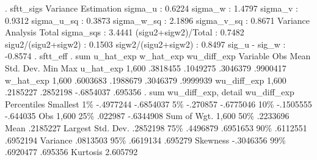 . sftt_sigs
{\smallskip}
               Variance Estimation          
sigma_u    :       0.6224
sigma_w    :       1.4797
sigma_v    :       0.9312
sigma_u_sq :       0.3873
sigma_w_sq :       2.1896
sigma_v_sq :       0.8671
               Variance Analysis          
Total sigma_sqs     :  3.4441
(sigu2+sigw2)/Total :  0.7482
sigu2/(sigu2+sigw2) :  0.1503
sigw2/(sigu2+sigw2) :  0.8497
sig_u - sig_w       : -0.8574
{\smallskip}
. sftt_eff
{\smallskip}
. sum u_hat_exp w_hat_exp wu_diff_exp
{\smallskip}
    Variable {\VBAR}        Obs        Mean    Std. Dev.       Min        Max
   u_hat_exp {\VBAR}      1,600    .3818455    .1049275   .3046379   .9900417
   w_hat_exp {\VBAR}      1,600    .6003683    .1988679   .3046379   .9999939
 wu_diff_exp {\VBAR}      1,600    .2185227    .2852198  -.6854037    .695356
{\smallskip}
. sum wu_diff_exp, detail
{\smallskip}
                         wu_diff_exp
      Percentiles      Smallest
 1\%    -.4977244      -.6854037
 5\%     -.270857      -.6775046
10\%    -.1505555       -.644035       Obs               1,600
25\%      .022987      -.6344908       Sum of Wgt.       1,600
{\smallskip}
50\%     .2233696                      Mean           .2185227
                        Largest       Std. Dev.      .2852198
75\%     .4496879       .6951653
90\%     .6112551       .6952194       Variance       .0813503
95\%     .6619134        .695279       Skewness      -.3046356
99\%     .6920477        .695356       Kurtosis       2.605792
{\smallskip}
